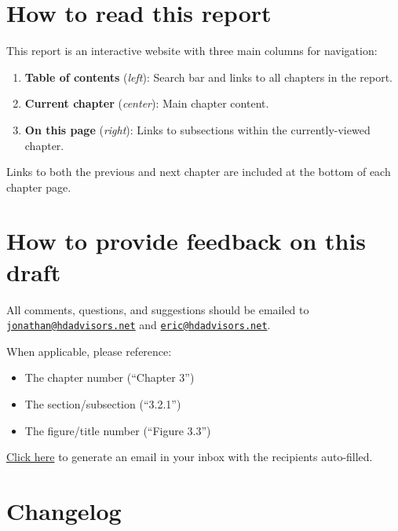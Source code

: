 \documentclass[
  letterpaper,
  DIV=11,
  numbers=noendperiod]{scrreprt}
\providecommand{\tightlist}{%
  \setlength{\itemsep}{0pt}\setlength{\parskip}{0pt}}\usepackage{longtable,booktabs,array}
\begin{document}
\hypertarget{how-to-read-this-report}{%
\section*{How to read this report}\label{how-to-read-this-report}}

This report is an interactive website with three main columns for
navigation:

\begin{enumerate}
\def\labelenumi{\arabic{enumi}.}
\tightlist
\item
  \textbf{Table of contents} (\emph{left}): Search bar and links to all
  chapters in the report.
\item
  \textbf{Current chapter} (\emph{center}): Main chapter content.
\item
  \textbf{On this page} (\emph{right}): Links to subsections within the
  currently-viewed chapter.
\end{enumerate}

Links to both the previous and next chapter are included at the bottom
of each chapter page.

\hypertarget{how-to-provide-feedback-on-this-draft}{%
\section*{How to provide feedback on this
draft}\label{how-to-provide-feedback-on-this-draft}}

All comments, questions, and suggestions should be emailed to
\href{mailto:jonathan@hdadvisors.net}{\nolinkurl{jonathan@hdadvisors.net}}
and \href{mailto:eric@hdadvisors.net}{\nolinkurl{eric@hdadvisors.net}}.

When applicable, please reference:

\begin{itemize}
\tightlist
\item
  The chapter number (``Chapter 3'')
\item
  The section/subsection (``3.2.1'')
\item
  The figure/title number (``Figure 3.3'')
\end{itemize}

\href{mailto:jonathan@hdadvisors.net,eric@hdadvisors.net}{Click here} to
generate an email in your inbox with the recipients auto-filled.

\hypertarget{changelog}{%
\section*{Changelog}\label{changelog}}
\end{document}
